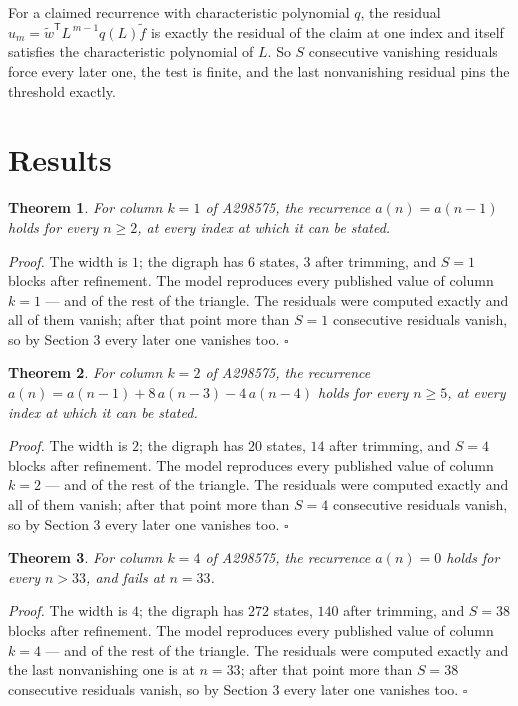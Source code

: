 \documentclass[11pt]{article}
\newtheorem{theorem}{Theorem}
\theoremstyle{definition}
\begin{document}
For a claimed recurrence with characteristic polynomial $q$, the residual $u_m = \tilde w^{\mathsf T}L^{\,m-1}q(L)\tilde f$ is exactly the residual of the claim at one index and itself satisfies the characteristic polynomial of $L$. So $S$ consecutive vanishing residuals force every later one, the test is finite, and the last nonvanishing residual pins the threshold exactly.

\section{Results}

\begin{theorem} For column $k = 1$ of A298575, the recurrence $a(n) = a(n-1)$ holds for every $n \ge 2$, at every index at which it can be stated.\end{theorem}

{\itshape Proof.} The width is $1$; the digraph has $6$ states, $3$ after trimming, and $S = 1$ blocks after refinement. The model reproduces every published value of column $k = 1$ --- and of the rest of the triangle. The residuals were computed exactly and all of them vanish; after that point more than $S = 1$ consecutive residuals vanish, so by Section 3 every later one vanishes too. $\square$

\begin{theorem} For column $k = 2$ of A298575, the recurrence $a(n) = a(n-1) + 8\,a(n-3) - 4\,a(n-4)$ holds for every $n \ge 5$, at every index at which it can be stated.\end{theorem}

{\itshape Proof.} The width is $2$; the digraph has $20$ states, $14$ after trimming, and $S = 4$ blocks after refinement. The model reproduces every published value of column $k = 2$ --- and of the rest of the triangle. The residuals were computed exactly and all of them vanish; after that point more than $S = 4$ consecutive residuals vanish, so by Section 3 every later one vanishes too. $\square$

\begin{theorem} For column $k = 4$ of A298575, the recurrence $a(n) = 0$ holds for every $n > 33$, and fails at $n = 33$.\end{theorem}

{\itshape Proof.} The width is $4$; the digraph has $272$ states, $140$ after trimming, and $S = 38$ blocks after refinement. The model reproduces every published value of column $k = 4$ --- and of the rest of the triangle. The residuals were computed exactly and the last nonvanishing one is at $n = 33$; after that point more than $S = 38$ consecutive residuals vanish, so by Section 3 every later one vanishes too. $\square$
\end{document}

